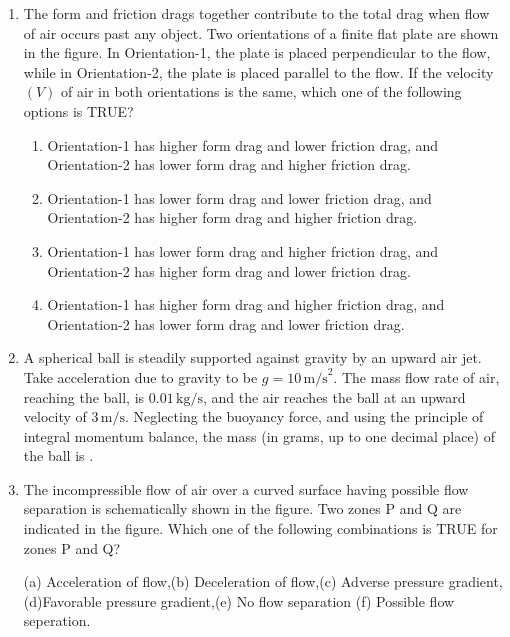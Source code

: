\documentclass[journal,12pt,onecolumn]{IEEEtran}
\theoremstyle{remark}
\begin{document}
\begin{enumerate}
    \item The form and friction drags together contribute to the total drag when flow of air occurs past any object. Two orientations of a finite flat plate are shown in the figure. In Orientation-1, the plate is placed perpendicular to the flow, while in Orientation-2, the plate is placed parallel to the flow. If the velocity $(V)$ of air in both orientations is the same, which one of the following options is TRUE?
    \begin{figure}[H]
        \centering
          
    \end{figure}
    \begin{enumerate}
        \item Orientation-1 has higher form drag and lower friction drag, and Orientation-2 has lower form drag and higher friction drag.
        \item Orientation-1 has lower form drag and lower friction drag, and Orientation-2 has higher form drag and higher friction drag.
        \item Orientation-1 has lower form drag and higher friction drag, and Orientation-2 has higher form drag and lower friction drag.
        \item Orientation-1 has higher form drag and higher friction drag, and Orientation-2 has lower form drag and lower friction drag.
    \end{enumerate}

    \item A spherical ball is steadily supported against gravity by an upward air jet. Take acceleration due to gravity to be $g = 10 \, \text{m/s}^2$. The mass flow rate of air, reaching the ball, is $0.01 \, \text{kg/s}$, and the air reaches the ball at an upward velocity of $3 \, \text{m/s}$. Neglecting the buoyancy force, and using the principle of integral momentum balance, the mass (in grams, up to one decimal place) of the ball is {\underline{\hspace{2cm}}}.
    \begin{figure}[H]
        \centering
          
    \end{figure}

    \item The incompressible flow of air over a curved surface having possible flow separation is schematically shown in the figure. Two zones P and Q are indicated in the figure. Which one of the following combinations is TRUE for zones P and Q?
    \begin{figure}[H]
        \centering
          
    \end{figure}
    (a) Acceleration of flow,(b) Deceleration of flow,(c) Adverse pressure gradient,(d)Favorable pressure gradient,(e) No flow separation (f) Possible flow seperation.
    \begin{enumerate}
        

\end{enumerate}
\end{enumerate}
\end{document}
